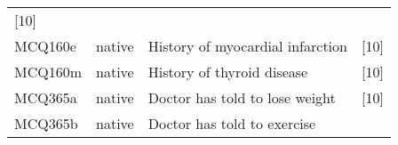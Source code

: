 \documentclass[]{article}
\begin{document}
\begin{longtable}[]{@{}llll@{}}
\begin{minipage}[t]{0.31\columnwidth}
{[}10{]}\strut
\end{minipage}\tabularnewline
\begin{minipage}[t]{0.10\columnwidth}\raggedright
MCQ160e\strut
\end{minipage} & \begin{minipage}[t]{0.05\columnwidth}\raggedright
native\strut
\end{minipage} & \begin{minipage}[t]{0.43\columnwidth}\raggedright
History of myocardial infarction\strut
\end{minipage} & \begin{minipage}[t]{0.31\columnwidth}\raggedright
{[}10{]}\strut
\end{minipage}\tabularnewline
\begin{minipage}[t]{0.10\columnwidth}\raggedright
MCQ160m\strut
\end{minipage} & \begin{minipage}[t]{0.05\columnwidth}\raggedright
native\strut
\end{minipage} & \begin{minipage}[t]{0.43\columnwidth}\raggedright
History of thyroid disease\strut
\end{minipage} & \begin{minipage}[t]{0.31\columnwidth}\raggedright
{[}10{]}\strut
\end{minipage}\tabularnewline
\begin{minipage}[t]{0.10\columnwidth}\raggedright
MCQ365a\strut
\end{minipage} & \begin{minipage}[t]{0.05\columnwidth}\raggedright
native\strut
\end{minipage} & \begin{minipage}[t]{0.43\columnwidth}\raggedright
Doctor has told to lose weight\strut
\end{minipage} & \begin{minipage}[t]{0.31\columnwidth}\raggedright
{[}10{]}\strut
\end{minipage}\tabularnewline
\begin{minipage}[t]{0.10\columnwidth}\raggedright
MCQ365b\strut
\end{minipage} & \begin{minipage}[t]{0.05\columnwidth}\raggedright
native\strut
\end{minipage} & \begin{minipage}[t]{0.43\columnwidth}\raggedright
Doctor has told to exercise\strut
\end{minipage} & \begin{minipage}[t]{0.31\columnwidth}\raggedright

\end{minipage}
\end{longtable}
\end{document}
